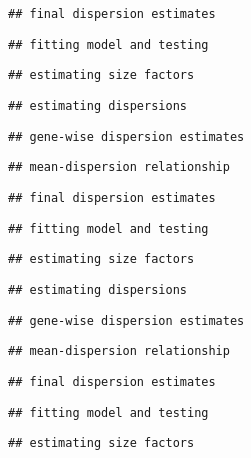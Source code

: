 \documentclass[
]{article}
\begin{document}
\begin{verbatim}
## final dispersion estimates
\end{verbatim}

\begin{verbatim}
## fitting model and testing
\end{verbatim}

\begin{verbatim}
## estimating size factors
\end{verbatim}

\begin{verbatim}
## estimating dispersions
\end{verbatim}

\begin{verbatim}
## gene-wise dispersion estimates
\end{verbatim}

\begin{verbatim}
## mean-dispersion relationship
\end{verbatim}

\begin{verbatim}
## final dispersion estimates
\end{verbatim}

\begin{verbatim}
## fitting model and testing
\end{verbatim}

\begin{verbatim}
## estimating size factors
\end{verbatim}

\begin{verbatim}
## estimating dispersions
\end{verbatim}

\begin{verbatim}
## gene-wise dispersion estimates
\end{verbatim}

\begin{verbatim}
## mean-dispersion relationship
\end{verbatim}

\begin{verbatim}
## final dispersion estimates
\end{verbatim}

\begin{verbatim}
## fitting model and testing
\end{verbatim}

\begin{verbatim}
## estimating size factors
\end{verbatim}
\end{document}
